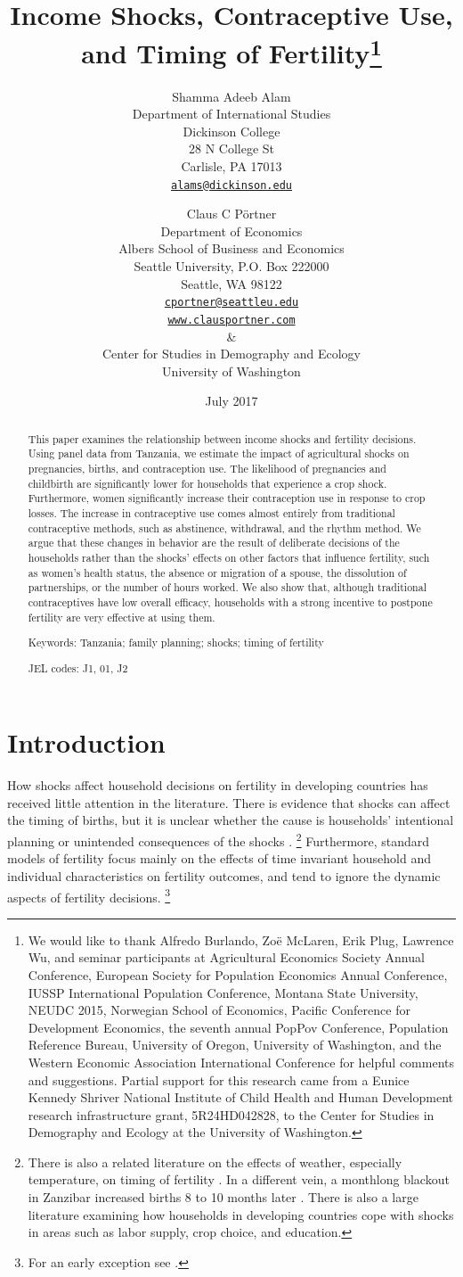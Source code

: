 \documentclass[letterpaper,12pt]{article}
\title{Income Shocks, Contraceptive Use,\\ and Timing of Fertility\thanks{%
We would like to thank 
Alfredo Burlando,
Zo\"e McLaren, 
Erik Plug,
Lawrence Wu, 
and seminar participants at 
Agricultural Economics Society Annual Conference,
European Society for Population Economics Annual Conference,
IUSSP International Population Conference,
Montana State University, 
NEUDC 2015,
Norwegian School of Economics, 
Pacific Conference for Development Economics, 
the seventh annual PopPov Conference, 
Population Reference Bureau,
University of Oregon,
University of Washington,
and the 
Western Economic Association International Conference
for helpful comments and suggestions.
Partial support for this research came from a Eunice Kennedy Shriver National
Institute of Child Health and Human Development research infrastructure grant,
5R24HD042828, to the Center for Studies in Demography and Ecology at the
University of Washington.
}}
\author{Shamma Adeeb Alam\\
	Department of International Studies\\
	Dickinson College\\
	28 N College St\\
	Carlisle, PA 17013\\
	\href{mailto:alams@dickinson.edu}{\texttt{alams@dickinson.edu}}\\
\and
	Claus C P\"ortner\\
    Department of Economics\\
    Albers School of Business and Economics\\
    Seattle University, P.O. Box 222000\\
    Seattle, WA 98122\\
    \href{mailto:cportner@seattleu.edu}{\texttt{cportner@seattleu.edu}}\\
    \href{http://www.clausportner.com}{\texttt{www.clausportner.com}}\\
    \& \\
    Center for Studies in Demography and Ecology \\
    University of Washington\\ 
    }
\date{July 2017}
\begin{document}
\def\sym#1{\ifmmode^{#1}\else\(^{#1}\)\fi}

\setcounter{page}{0}
\maketitle
\thispagestyle{empty}

\newpage
\setcounter{page}{0}
\thispagestyle{empty}

\doublespacing


\begin{abstract} 
\noindent This paper examines the relationship between income 
shocks and fertility decisions. 
Using panel data from Tanzania, we estimate the impact of agricultural shocks 
on 
pregnancies, 
births, 
and 
contraception use.
The likelihood of 
pregnancies and childbirth are significantly lower for households that experience
a crop shock.
Furthermore, women significantly increase their contraception use in response 
to crop losses. 
The increase in contraceptive use comes almost entirely from traditional 
contraceptive methods, such as abstinence, withdrawal, and the rhythm method.
We argue that these changes in behavior are the result of deliberate decisions of
the households rather than the shocks' effects on other factors that influence
fertility, such as women's health status, the absence or migration of a spouse, 
the dissolution of partnerships, or the number of hours worked. 
We also show that, although traditional contraceptives have low overall
efficacy, households with a strong incentive to postpone fertility
are very effective at using them.

\noindent Keywords: Tanzania; family planning; shocks; timing of fertility

\noindent JEL codes: J1, 01, J2
\end{abstract}

\newpage


\section{Introduction}

How shocks affect household decisions on fertility in developing countries has 
received little attention in the literature.
There is evidence that shocks can affect the timing of births, but it is unclear
whether the cause is households' intentional planning or unintended consequences 
of the shocks \citep{pitt98b,lindstrom99,Evans2010,Portner2014}.%
\footnote{
There is also a related literature on the effects of weather, especially temperature,
on timing of fertility \citep[see, for example,][]{Barreca2015}.
In a different vein, a monthlong blackout in Zanzibar increased 
births 8 to 10 months later \citep{Burlando2014}.
There is also a large literature examining how households in developing countries
cope with shocks in areas such as labor supply, crop choice, and education.
} 
Furthermore, standard models of fertility focus mainly on the effects of time
invariant household and individual characteristics on fertility outcomes, and 
tend to ignore the dynamic aspects of fertility decisions.%
\footnote{
For an early exception see \cite{Newman1984}.
}
\end{document}
